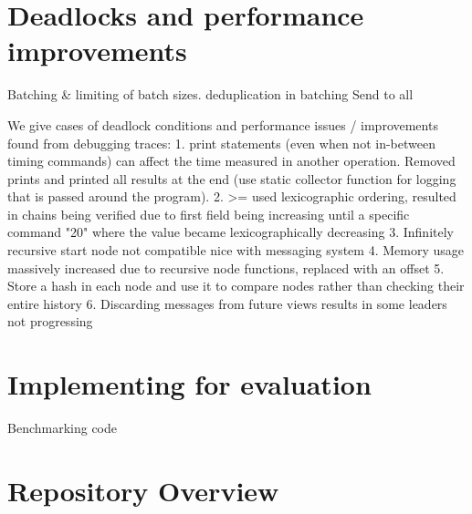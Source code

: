 \section{Deadlocks and performance improvements}
Batching \& limiting of batch sizes. deduplication in batching
Send to all

We give cases of deadlock conditions
and performance issues / improvements found from debugging traces:
1. print statements (even when not in-between timing commands) can affect the time measured in another operation. Removed prints and printed all results at the end (use static collector function for logging that is passed around the program).
2. >= used lexicographic ordering, resulted in chains being verified due to first field being increasing until a specific command "20" where the value became lexicographically decreasing
3. Infinitely recursive start node not compatible nice with messaging system
4. Memory usage massively increased due to recursive node functions, replaced with an offset
5. Store a hash in each node and use it to compare nodes rather than checking their entire history
6. Discarding messages from future views results in some leaders not progressing
\section{Implementing for evaluation}
Benchmarking code
\section{Repository Overview}
